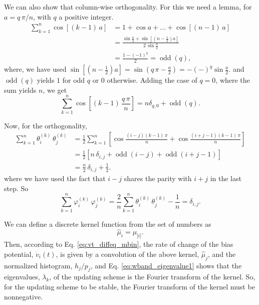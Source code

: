 \documentclass[reprint]{revtex4-1}
\begin{document}
{We can also show that column-wise orthogonality.
%
For this we need a lemma, for $a = q \, \pi/n$,
with $q$ a positive integer.
$$
\begin{aligned}
\sum_{k = 1}^n \cos[(k - 1) \, a]
&=
1 + \cos a + \dots + \cos[(n - 1) \, a]
\\
&=
\frac{
      \sin\frac a 2
    + \sin \left[ \left( n - \frac 1 2 \right) a \right]
    }
    {
      2 \, \sin \frac a 2
    }
\\
&=
\frac{ 1 - (-1)^q } { 2 }
= \operatorname{odd}(q),
\end{aligned}
$$
%
where, we have used
$\sin \left[ \left( n - \frac 1 2 \right) a \right]
= \sin \left( q \, \pi - \frac a 2 \right)
= -(-)^q\sin\frac a 2.$
%
and $\operatorname{odd}(q)$
yields $1$ for odd $q$ or $0$ otherwise.
%
Adding the case of $q = 0$, where the sum yields $n$,
we get
$$
\sum_{k = 1}^n \cos\left[(k - 1) \, \frac { q \, \pi } { n }  \right]
= n \delta_{q, 0} + \operatorname{odd}(q).
$$


Now, for the orthogonality,
$$
\begin{aligned}
  \sum_{k = 1}^n
  \theta^{(k)}_i \, \theta^{(k)}_j
  &=
  \frac 1 2
  \sum_{k = 1}^n
  \left[
    \cos \tfrac{ (i - j) (k - 1) \, \pi }
               {         n              }
    +
    \cos \tfrac{ (i + j - 1) (k - 1) \, \pi }
               {             n              }
  \right]
  \\
  &=
  \frac 1 2
  \left[
    n \, \delta_{i, j}
    +
    \operatorname{odd}(i - j)
    +
    \operatorname{odd}(i + j - 1)
  \right]
  \\
  &=
  \frac n 2 \, \delta_{i, j}
  + \frac 1 2.
\end{aligned}
$$
where we have used the fact
that $i - j$ shares the parity with $i + j$
in the last step.
%
So
$$
  \sum_{k = 1}^n
  \varphi^{(k)}_i \, \varphi^{(k)}_j
  =
  \frac 2 n
  \sum_{k = 1}^n
  \theta^{(k)}_i \, \theta^{(k)}_j
  -
  \frac 1 n
  =
  \delta_{i, j}.
$$
}
%



We can define a discrete kernel function from the set of numbers as
$$
\hat \mu_i = \mu_{ |i| }.
$$
Then, according to Eq. \eqref{eq:vt_diffeq_mbin},
the rate of change of the bias potential, $\dot v_i(t)$,
is given by a convolution of the above kernel, $\hat \mu_j$,
and the normalized histogram, $h_j/p_j$\cite{bussi2006},
and Eq. \eqref{eq:wband_eigenvalue1}
shows that the eigenvalues, $\lambda_k$, of the updating scheme
is the Fourier transform of the kernel.
%
So, for the updating scheme to be stable,
the Fourier transform of the kernel
must be nonnegative.
\end{document}
